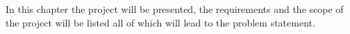 In this chapter the project will be presented, the requirements and the scope of the project will be listed all of which will lead to the problem statement.